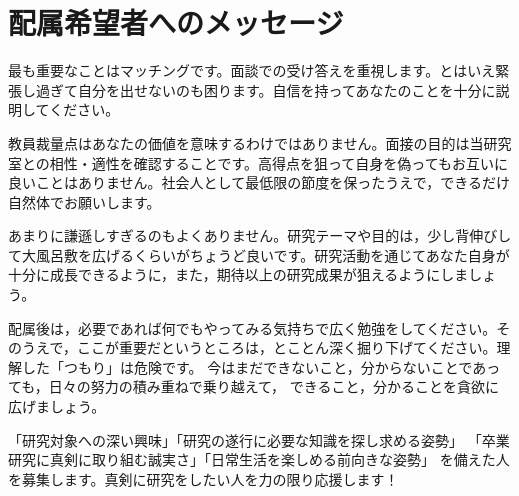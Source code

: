 \documentclass[paper=a4paper,fontsize=10.4pt]{jlreq}
\begin{document}
\section{配属希望者へのメッセージ}

最も重要なことはマッチングです。面談での受け答えを重視します。とはいえ緊張し過ぎて自分を出せないのも困ります。自信を持ってあなたのことを十分に説明してください。

教員裁量点はあなたの価値を意味するわけではありません。面接の目的は当研究室との相性・適性を確認することです。高得点を狙って自身を偽ってもお互いに良いことはありません。社会人として最低限の節度を保ったうえで，できるだけ自然体でお願いします。

あまりに謙遜しすぎるのもよくありません。研究テーマや目的は，少し背伸びして大風呂敷を広げるくらいがちょうど良いです。研究活動を通じてあなた自身が十分に成長できるように，また，期待以上の研究成果が狙えるようにしましょう。

配属後は，必要であれば何でもやってみる気持ちで広く勉強をしてください。そのうえで，ここが重要だというところは，とことん深く掘り下げてください。理解した「つもり」は危険です。
今はまだできないこと，分からないことであっても，日々の努力の積み重ねで乗り越えて，
できること，分かることを貪欲に広げましょう。

「研究対象への深い興味」「研究の遂行に必要な知識を探し求める姿勢」
「卒業研究に真剣に取り組む誠実さ」「日常生活を楽しめる前向きな姿勢」
を備えた人を募集します。真剣に研究をしたい人を力の限り応援します！

%
%
\end{document}
